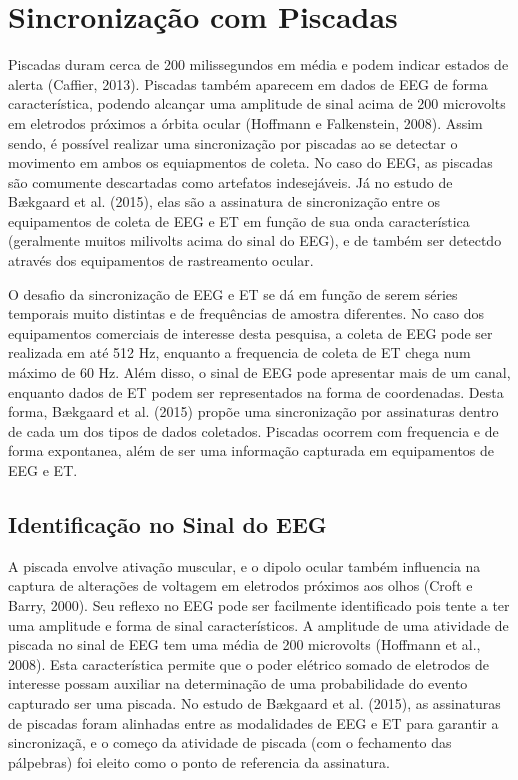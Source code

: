 \section{Sincronização com Piscadas}
Piscadas duram cerca de 200 milissegundos em média e podem indicar estados de alerta (Caffier, 2013). Piscadas também aparecem 
em dados de EEG de forma característica, podendo alcançar uma amplitude de sinal acima de 200 microvolts em eletrodos próximos a órbita ocular (Hoffmann e Falkenstein, 2008). Assim sendo, é possível realizar uma sincronização por piscadas ao se detectar 
o movimento em ambos os equiapmentos de coleta. No caso do EEG, as piscadas são comumente descartadas como artefatos indesejáveis. Já no estudo de 
Bækgaard et al. (2015), elas são a assinatura de sincronização entre os equipamentos de coleta de EEG e ET em função de sua onda característica (geralmente muitos milivolts acima do sinal do EEG), e de também 
ser detectdo através dos equipamentos de rastreamento ocular.

O desafio da sincronização de EEG e ET se dá em função de serem séries temporais muito distintas e 
de frequências de amostra diferentes. No caso dos equipamentos comerciais de interesse desta pesquisa,
a coleta de EEG pode ser realizada em até 512 Hz, enquanto a frequencia de coleta de ET chega num máximo de 60 Hz. 
Além disso, o sinal de EEG pode apresentar mais de um canal, enquanto dados de ET podem ser representados
na forma de coordenadas. Desta forma, Bækgaard et al. (2015) propõe uma sincronização por assinaturas dentro de cada um dos tipos de dados
coletados. Piscadas ocorrem com frequencia e de forma expontanea, além de ser uma informação capturada em 
equipamentos de EEG e ET.




\subsection{Identificação no Sinal do EEG}

A piscada envolve ativação muscular, e o dipolo ocular também influencia na captura de alterações de voltagem em eletrodos próximos aos olhos
(Croft e Barry, 2000). Seu reflexo no EEG pode ser facilmente identificado pois tente a ter uma amplitude e forma de sinal característicos. 
A amplitude de uma atividade de piscada no sinal de EEG tem uma média de 200 microvolts (Hoffmann et al., 2008). Esta característica permite
que o poder elétrico somado de eletrodos de interesse possam auxiliar na determinação de uma probabilidade do evento capturado ser uma piscada. 
No estudo de Bækgaard et al. (2015), as assinaturas de piscadas foram alinhadas entre as modalidades de EEG e ET para garantir a sincronizaçã, e
o começo da atividade de piscada (com o fechamento das pálpebras) foi eleito como o ponto de referencia da assinatura. 


